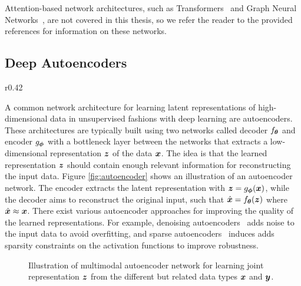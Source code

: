 \vspace{3mm}
\noindent Attention-based network architectures, such as Transformers~\cite{vaswani2017attention, dosovitskiy2020image} and Graph Neural Networks~\cite{battaglia2018relational, zhou2020graph}, are not covered in this thesis, so we refer the reader to the provided references for information on these networks.



\subsection{Deep Autoencoders}\label{sec:deep_autoencoders}

\begin{wrapfigure}{r}{0.42\textwidth}
	\centering
	\vspace{-3mm}
	\resizebox{0.39\textwidth}{!}{
		
	}
	\captionsetup{width=.9\linewidth}
	\caption{Illustration of an autoencoder network.}
	\label{fig:autoencoder}
	\vspace{-3mm}
\end{wrapfigure}
A common network architecture for learning latent representations of high-dimensional data in unsupervised fashions with deep learning are autoencoders. These architectures are typically built using two networks called decoder $f_{{\bm{\theta}}}$ and encoder $g_{{\bm{\phi}}}$ with a bottleneck layer between the networks that extracts a low-dimensional representation ${\bm{z}}$ of the data ${\bm{x}}$. The idea is that the learned representation ${\bm{z}}$ should contain enough relevant information for reconstructing the input data. Figure \ref{fig:autoencoder} shows an illustration of an autoencoder network. The encoder extracts the latent representation with ${\bm{z}} = g_{{\bm{\phi}}}({\bm{x}})$, while the decoder aims to reconstruct the original input, such that $\hat{{\bm{x}}} = f_{{\bm{\theta}}}({\bm{z}})$ where $\hat{{\bm{x}}} \approx {\bm{x}}$. There exist various autoencoder approaches for improving the quality of the learned representations. For example, denoising autoencoders~\cite{vincent2008extracting} adds noise to the input data to avoid overfitting, and sparse autoencoders~\cite{ng2011sparse} induces adds sparsity constraints on the activation functions to improve robustness.




\begin{figure}[t]
	\centering
	\resizebox{0.6\textwidth}{!}{
		
	}
	\caption{Illustration of multimodal autoencoder network for learning joint representation ${\bm{z}}$ from the different but related data types ${\bm{x}}$ and ${\bm{y}}$. 
	}
	\label{fig:multimodal_autoencoder}
	\vspace{-3mm}
\end{figure}

